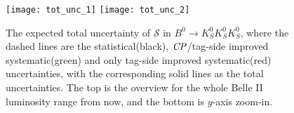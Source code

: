 \begin{figure}[htpb]
	\centering
	\texttt{[image: tot\_unc\_1]}
	\texttt{[image: tot\_unc\_2]}
	\caption{The expected total uncertainty of $\mathcal{S}$ in $B^0 \to K_S^0  K_S^0  K_S^0$, where the dashed lines are the statistical(black), $\it{CP}$/tag-side improved systematic(green) and only tag-side improved systematic(red) uncertainties, with the corresponding solid lines as the total uncertainties. The top is the overview for the whole Belle II luminosity range from now, and the bottom is $y$-axis zoom-in.}
	\label{fig:tot_exp}
\end{figure}

